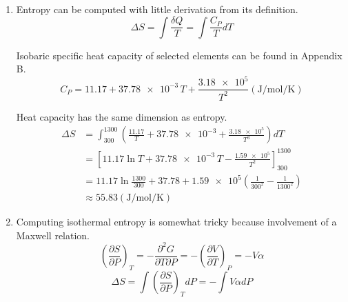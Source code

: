 \begin{@empty}
\begin{problem}
\end{problem}

\begin{answer}
    \begin{enumerate}
        \item Entropy can be computed with little derivation from its
            definition.
            \[ \Delta S = \int \frac{\delta Q}{T} = \int \frac{C_P}{T} dT \]

            Isobaric specific heat capacity of selected elements can be found
            in Appendix B.
            \[ C_P = 11.17 + \num{37.78e-3}\,T + \frac{\num{3.18e5}}{T^2} \left( \si{\joule\per\mol\per\kelvin} \right) \]

            Heat capacity has the same dimension as entropy.
            \begin{align*}
                \Delta S &= \int_{300}^{1300} \left( \frac{11.17}{T} + \num{37.78e-3} + \frac{\num{3.18e5}}{T^3} \right) dT \\
                    &= \left[ 11.17 \ln T + \num{37.78e-3}\, T - \frac{\num{1.59e5}}{T^2} \right]_{300}^{1300} \\
                    &= 11.17 \ln \frac{1300}{300} + 37.78
                        + \num{1.59e5} \left( \frac{1}{300^2} - \frac{1}{1300^2} \right) \\
                    &\approx 55.83 \left( \si{\joule\per\mol\per\kelvin} \right)
            \end{align*}

        \item Computing isothermal entropy is somewhat tricky because
            involvement of a Maxwell relation.
            \[
                \left( \frac{\partial S}{\partial P} \right)_T
                = -\frac{\partial^2 G}{\partial T \partial P}
                = -\left( \frac{\partial V}{\partial T} \right)_P
                = -V \alpha
            \]
            \[ \Delta S = \int \left( \frac{\partial S}{\partial P} \right)_T dP = -\int V \alpha dP \]

            \begin{@empty}
                \newcommand{\stdT}{\SI{298}{\kelvin}}
                \newcommand{\stdP}{\SI{1}{\atm}}
                \newcommand{\thisa}{\SI{40e-6}{\per\kelvin}}
                \newcommand{\thisb}{\SI{26e-7}{\per\atm}}
                \newcommand{\thisVS}{\SI[per-mode=fraction]{6.60}{\cc\per\mol}}
                \newcommand{\exponent}{\num{80e-6} - \thisb \left( P - \stdP \right)}
                \newcommand{\convert}{\SI[per-mode=fraction]{0.101325}{\joule\per\atm\per\cc}}


\end{@empty}
\end{enumerate}
\end{answer}
\end{@empty}
